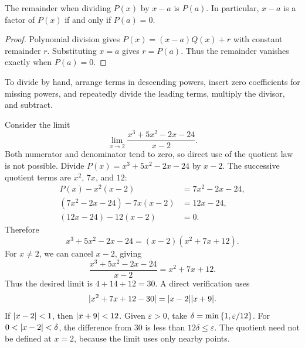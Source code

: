 \documentclass[11pt,a4paper]{amsart}
\begin{document}
\begin{corollary}
  The remainder when dividing \(P(x)\) by \(x-a\) is \(P(a)\).
  In particular, \(x-a\) is a factor of \(P(x)\) if and only if
  \(P(a)=0\).
\end{corollary}

\begin{proof}
  Polynomial division gives \(P(x)=(x-a)Q(x)+r\) with constant
  remainder \(r\). Substituting \(x=a\) gives \(r=P(a)\).
  Thus the remainder vanishes exactly when \(P(a)=0\).
\end{proof}

To divide by hand, arrange terms in descending powers, insert zero
coefficients for missing powers, and repeatedly divide the leading
terms, multiply the divisor, and subtract.

\begin{example}\label{ex:division-exact}
  Consider the limit
  \[
    \lim_{x\to2}\frac{x^3+5x^2-2x-24}{x-2}.
  \]
  Both numerator and denominator tend to zero, so direct use of the
  quotient law is not possible. Divide
  \(P(x)=x^3+5x^2-2x-24\) by \(x-2\).
  The successive quotient terms are \(x^2\), \(7x\), and \(12\):
  \begin{align*}
    P(x)-x^2(x-2)&=7x^2-2x-24,\\
    (7x^2-2x-24)-7x(x-2)&=12x-24,\\
    (12x-24)-12(x-2)&=0.
  \end{align*}
  Therefore
  \[
    x^3+5x^2-2x-24=(x-2)(x^2+7x+12).
  \]
  For \(x\neq2\), we can cancel \(x-2\), giving
  \[
    \frac{x^3+5x^2-2x-24}{x-2}=x^2+7x+12.
  \]
  Thus the desired limit is \(4+14+12=30\). A direct verification
  uses
  \[
    \lvert x^2+7x+12-30\rvert=\lvert x-2\rvert\lvert x+9\rvert.
  \]
  If \(\lvert x-2\rvert<1\), then \(\lvert x+9\rvert<12\). Given
  \(\varepsilon>0\), take \(\delta=\min\left\lbrace1,\varepsilon/12\right\rbrace\).
  For \(0<\lvert x-2\rvert<\delta\), the difference from \(30\) is
  less than \(12\delta\leq\varepsilon\). The quotient need not
  be defined at \(x=2\), because the limit uses only nearby points.
\end{example}
\end{document}

